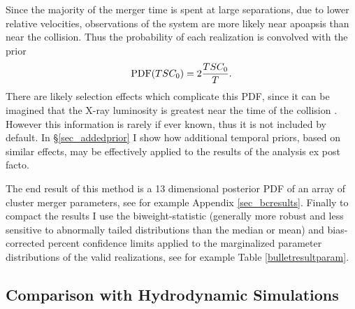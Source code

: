 \documentclass[12pt]{emulateapj}
\begin{document}
Since the majority of the merger time is spent at large separations, due to lower relative velocities, observations of the system are more likely near apoapsis than near the collision.  Thus the probability of each realization is convolved with the prior 
\begin{equation}
{\rm PDF}(TSC_0) = 2 \frac{TSC_0}{T}.
\label{eq_timeprior}
\end{equation}
There are likely selection effects which complicate this PDF, since it can be imagined that the X-ray luminosity is greatest near the time of the collision \citep[see e.g.][]{Randall:2002kk}.
However this information is rarely if ever known, thus it is not included by default.  In \S\ref{sec_addedprior} I show how additional temporal priors, based on similar effects, may be effectively applied to the results of the analysis ex post facto.

The end result of this method is a 13 dimensional posterior PDF of an array of cluster merger parameters, see for example Appendix \ref{sec_bcresults}.
Finally to compact the results I use the biweight-statistic (generally more robust and less sensitive to abnormally tailed distributions than the median or mean) and bias-corrected percent confidence limits \citep{Beers:1990kg} applied to the marginalized parameter distributions of the valid realizations, see for example Table \ref{bulletresultparam}.


\subsection{Comparison with Hydrodynamic Simulations} \label{sec_sfcomp}
\end{document}
